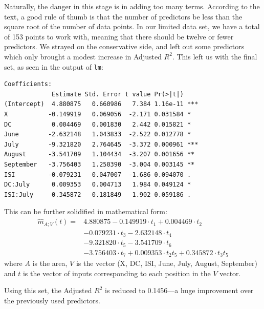 \documentclass{article}
\begin{document}
Naturally, the danger in this stage is in adding too many terms. According to
the text, a good rule of thumb is that the number of predictors be less than
the square root of the number of data points. In our limited data set, we have
a total of 153 points to work with, meaning that there should be twelve or
fewer predictors. We strayed on the conservative side, and left out some
predictors which only brought a modest increase in Adjusted $R^2$. This left us
with the final set, as seen in the output of \verb=lm=:

\begin{verbatim}
Coefficients:
             Estimate Std. Error t value Pr(>|t|)    
(Intercept)  4.880875   0.660986   7.384 1.16e-11 ***
X           -0.149919   0.069056  -2.171 0.031584 *  
DC           0.004469   0.001830   2.442 0.015821 *  
June        -2.632148   1.043833  -2.522 0.012778 *  
July        -9.321820   2.764645  -3.372 0.000961 ***
August      -3.541709   1.104434  -3.207 0.001656 ** 
September   -3.756403   1.250390  -3.004 0.003145 ** 
ISI         -0.079231   0.047007  -1.686 0.094070 .  
DC:July      0.009353   0.004713   1.984 0.049124 *  
ISI:July     0.345872   0.181849   1.902 0.059186 .  
\end{verbatim}

This can be further solidified in mathematical form:
\begin{align*}
  \widehat{m}_{A;V}(t) = &4.880875 - 0.149919 \cdot t_1 + 0.004469 \cdot t_2 \\
                         &- 0.079231 \cdot t_3 - 2.632148 \cdot t_4 \\
                         &- 9.321820 \cdot t_5 - 3.541709\cdot t_6 \\
                         &- 3.756403\cdot t_7 + 0.009353\cdot t_2 t_5 
                         + 0.345872\cdot t_3 t_5
\end{align*}
where $A$ is the area, $V$ is the vector (X, DC, ISI, June, July, August, 
September) and $t$ is the vector of inputs corresponding to each position in 
the $V$ vector.

Using this set, the Adjusted $R^2$ is reduced to 0.1456---a huge improvement
over the previously used predictors.

%
\end{document}
